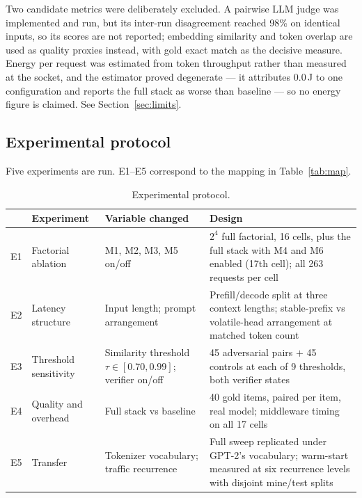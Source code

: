 \documentclass[11pt,a4paper]{article}
\begin{document}
Two candidate metrics were deliberately excluded. A pairwise LLM judge was
implemented and run, but its inter-run disagreement reached 98\% on identical
inputs, so its scores are not reported; embedding similarity and token overlap
are used as quality proxies instead, with gold exact match as the decisive
measure. Energy per request was estimated from token throughput rather than
measured at the socket, and the estimator proved degenerate --- it attributes
0.0\,J to one configuration and reports the full stack as worse than baseline ---
so no energy figure is claimed. See Section~\ref{sec:limits}.

\subsection{Experimental protocol}
\label{sec:protocol}

Five experiments are run. E1--E5 correspond to the mapping in
Table~\ref{tab:map}.

\begin{table}[htbp]
\centering
\caption{Experimental protocol.}
\label{tab:protocol}
\footnotesize
\begin{tabularx}{\textwidth}{@{}l L{3.6cm} L{3.4cm} X@{}}
\toprule
& \textbf{Experiment} & \textbf{Variable changed} & \textbf{Design} \\
\midrule
E1 & Factorial ablation & M1, M2, M3, M5 on/off & $2^4$ full factorial, 16 cells, plus the full stack with M4 and M6 enabled (17th cell); all 263 requests per cell \\
E2 & Latency structure & Input length; prompt arrangement & Prefill/decode split at three context lengths; stable-prefix vs volatile-head arrangement at matched token count \\
E3 & Threshold sensitivity & Similarity threshold $\tau \in [0.70,0.99]$; verifier on/off & 45 adversarial pairs $+$ 45 controls at each of 9 thresholds, both verifier states \\
E4 & Quality and overhead & Full stack vs baseline & 40 gold items, paired per item, real model; middleware timing on all 17 cells \\
E5 & Transfer & Tokenizer vocabulary; traffic recurrence & Full sweep replicated under GPT-2's vocabulary; warm-start measured at six recurrence levels with disjoint mine/test splits \\
\bottomrule
\end{tabularx}
\end{table}
\end{document}
